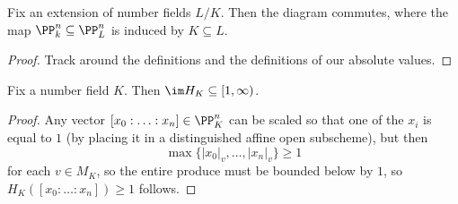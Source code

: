 \documentclass[../notes.tex]{subfiles}
\begin{document}
\begin{lemma} \label{lem:h-field-invaraint}
	Fix an extension of number fields $L/K$. Then the diagram
	commutes, where the map $\PP^n_k\subseteq\PP^n_L$ is induced by $K\subseteq L$.
\end{lemma}
\begin{proof}
	Track around the definitions and the definitions of our absolute values.
\end{proof}
\begin{lemma}
	Fix a number field $K$. Then $\im H_K\subseteq[1,\infty)$.
\end{lemma}
\begin{proof}
	Any vector $[x_0:\ldots:x_n]\in\PP^n_K$ can be scaled so that one of the $x_i$ is equal to $1$ (by placing it in a distinguished affine open subscheme), but then
	\[\max\{|x_0|_v,\ldots,|x_n|_v\}\ge1\]
	for each $v\in M_K$, so the entire produce must be bounded below by $1$, so $H_K([x_0:\ldots:x_n])\ge1$ follows.
\end{proof}
\end{document}
